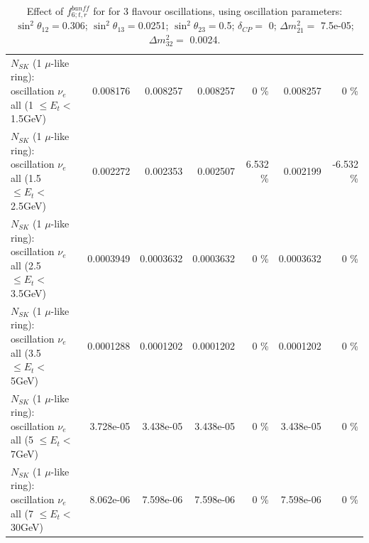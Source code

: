 \begin{table}
\begin{tabular}{| l | r | r | r  r | r  r |}
$N_{SK}$ (1 $\mu$-like ring): oscillation $\nu_{e}$ all (1 $\leq E_{t} <$ 1.5GeV) &        0.008176 &        0.008257 &        0.008257 &        0 \%  &        0.008257 &        0 \%  \\ 
$N_{SK}$ (1 $\mu$-like ring): oscillation $\nu_{e}$ all (1.5 $\leq E_{t} <$ 2.5GeV) &        0.002272 &        0.002353 &        0.002507 &    6.532 \%  &        0.002199 &   -6.532 \%  \\ 
$N_{SK}$ (1 $\mu$-like ring): oscillation $\nu_{e}$ all (2.5 $\leq E_{t} <$ 3.5GeV) &       0.0003949 &       0.0003632 &       0.0003632 &        0 \%  &       0.0003632 &        0 \%  \\ 
$N_{SK}$ (1 $\mu$-like ring): oscillation $\nu_{e}$ all (3.5 $\leq E_{t} <$ 5GeV) &       0.0001288 &       0.0001202 &       0.0001202 &        0 \%  &       0.0001202 &        0 \%  \\ 
 $N_{SK}$ (1 $\mu$-like ring): oscillation $\nu_{e}$ all (5 $\leq E_{t} <$ 7GeV) &       3.728e-05 &       3.438e-05 &       3.438e-05 &        0 \%  &       3.438e-05 &        0 \%  \\ 
$N_{SK}$ (1 $\mu$-like ring): oscillation $\nu_{e}$ all (7 $\leq E_{t} <$ 30GeV) &       8.062e-06 &       7.598e-06 &       7.598e-06 &        0 \%  &       7.598e-06 &        0 \%  \\ 
\hline
\hline
\end{tabular}
\caption{ Effect of $f_{6; t, r}^{banff}$ for for 3 flavour oscillations, using oscillation parameters:  $\sin^2\theta_{12} = $0.306; $\sin^2\theta_{13} = $0.0251; $\sin^2\theta_{23} = $0.5; $\delta_{CP} = $        0; $\Delta m^2_{21} = $    7.5e-05; $\Delta m^2_{32} = $    0.0024. }
\label{tab:num_banff_06_1RmuT_3f_osc_t13:0.0251}
\end{table}
\clearpage
